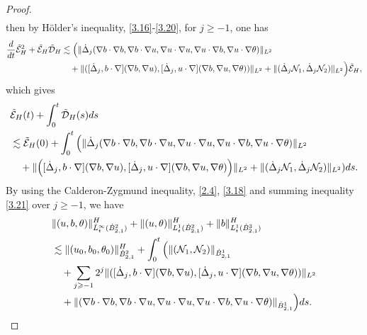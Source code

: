 \documentclass[10pt,a4paper]{amsart}
\numberwithin{equation}{section}
\begin{document}
\begin{proof}
\begin{equation}
\begin{aligned}
\end{aligned}
\end{equation}
then by H\"older's inequality, \eqref{3.16}-\eqref{3.20}, for $j\geqslant -1$, 
one has
\begin{align*}
\frac{\rm d}{{\rm d}t}\tilde{\mathcal{E}}_H^2+\tilde{\mathcal{E}}_H
 \tilde{\mathcal{D}}_H 
&\lesssim\Big{(}\|\dot{\Delta}_j
 (\nabla b\cdot\nabla b,\nabla b\cdot\nabla u,\nabla u
 \cdot\nabla u,\nabla u\cdot\nabla b,
 \nabla u\cdot\nabla \theta)\|_{L^2}\\
&\quad +\|([\dot{\Delta}_j,b\cdot\nabla](\nabla b,\nabla u),[\dot{\Delta}_j,u\cdot\nabla]
 (\nabla b,\nabla u,\nabla\theta))\|_{L^2}
 +\|(\dot{\Delta}_j \mathcal{N}_1,\dot{\Delta}_j \mathcal{N}_2)\|_{L^2}\Big{)}
 \tilde{\mathcal{E}}_H,
\end{align*}
which gives 
 \begin{equation}\label{3.21}
\begin{aligned}
&\tilde{\mathcal{E}}_H(t)+\int_0^t\tilde{\mathcal{D}}_H(s){\rm d}s \\
&\lesssim\tilde{\mathcal{E}}_H(0)+\int_0^t\Big(\|\dot{\Delta}_j
 (\nabla b\cdot\nabla b,\nabla b\cdot\nabla u,\nabla u\cdot\nabla u,
 \nabla u\cdot\nabla b,  \nabla u\cdot\nabla \theta)\|_{L^2} \\
&\quad +\|\Big([\dot{\Delta}_j,b\cdot\nabla](\nabla b,\nabla u),[\dot{\Delta}_j,
 u\cdot\nabla](\nabla b,\nabla u,\nabla\theta)\Big)\|_{L^2}
 +\|(\dot{\Delta}_j \mathcal{N}_1,\dot{\Delta}_j \mathcal{N}_2)\|_{L^2}){\rm d}s.
\end{aligned}
\end{equation}
By using the Calderon-Zygmund inequality, \eqref{2.4}, \eqref{3.18} and summing 
inequality \eqref{3.21} over $j\geqslant -1$, we have
\begin{equation}\label{3.22}
\begin{aligned}
&\|(u,b,\theta)\|_{\tilde{L}^\infty_t(\dot{B}^2_{2,1})}^H
  +\|(u,\theta)\|_{{L}^1_t(\dot{B}^2_{2,1})}^H+\|b\|_{{L}^1_t(\dot{B}^3_{2,1})}^H \\
&\lesssim\|(u_0,b_0,\theta_0)\|_{\dot{B}^2_{2,1}}^H+\int_0^t\Big{(}\|( \mathcal{N}_1, 
 \mathcal{N}_2)\|_{\dot{B}^1_{2,1}} \\
&\quad +\sum_{j\geqslant-1}2^j\|([\dot{\Delta}_j,b\cdot\nabla](\nabla b,\nabla u),
 [\dot{\Delta}_j,u\cdot\nabla](\nabla b,\nabla u,\nabla\theta))\|_{L^2} \\
&\quad +\|(\nabla b\cdot\nabla b,\nabla b\cdot\nabla u,\nabla u\cdot\nabla u,
 \nabla u\cdot\nabla b,\nabla u\cdot\nabla \theta)\|_{\dot{B}^1_{2,1}}\Big{)}{\rm d}s.
\end{aligned}
\end{equation}


\end{proof}
\end{document}
